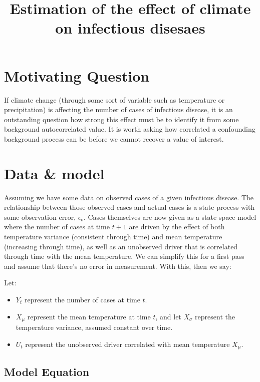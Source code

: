 \documentclass[
  letterpaper,
  DIV=11,
  numbers=noendperiod]{scrartcl}
\title{Estimation of the effect of climate on infectious disesaes}
\author{}
\date{}
\providecommand{\tightlist}{%
  \setlength{\itemsep}{0pt}\setlength{\parskip}{0pt}}\usepackage{longtable,booktabs,array}
\renewcommand*\contentsname{Table of contents}
\newcommand\contentsname{Table of contents}
\begin{document}
\maketitle

\renewcommand*\contentsname{Table of contents}
{
\hypersetup{linkcolor=}
\setcounter{tocdepth}{3}
\tableofcontents
}
\section{Motivating Question}\label{motivating-question}

If climate change (through some sort of variable such as temperature or
precipitation) is affecting the number of cases of infectious disease,
it is an outstanding question how strong this effect must be to identify
it from some background autocorrelated value. It is worth asking how
correlated a confounding background process can be before we cannot
recover a value of interest.

\section{Data \& model}\label{data-model}

Assuming we have some data on observed cases of a given infectious
disease. The relationship between those observed cases and actual cases
is a state process with some observation error, \(\epsilon_o\). Cases
themselves are now given as a state space model where the number of
cases at time \(t+1\) are driven by the effect of both temperature
variance (consistent through time) and mean temperature (increasing
through time), as well as an unobserved driver that is correlated
through time with the mean temperature. We can simplify this for a first
pass and assume that there's no error in measurement. With this, then we
say:

Let:

\begin{itemize}
\tightlist
\item
  \(Y_t\) represent the number of cases at time \(t\).
\item
  \(X_{\mu}\) represent the mean temperature at time \(t\), and let
  \(X_{\sigma}\) represent the temperature variance, assumed constant
  over time.
\item
  \(U_t\) represent the unobserved driver correlated with mean
  temperature \(X_{\mu}\).
\end{itemize}

\subsection{Model Equation}\label{model-equation}
\end{document}
